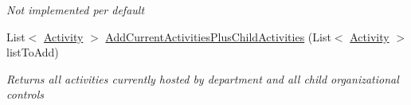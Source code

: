 \begin{DoxyCompactItemize}
\begin{DoxyCompactList}\small\item\em Not implemented per default \end{DoxyCompactList}\item 
List$<$ \hyperlink{class_simulation_core_1_1_h_c_c_m_elements_1_1_activity}{Activity} $>$ \hyperlink{class_general_health_care_elements_1_1_control_units_1_1_control_unit_organizational_unit_a42a076aea20d7fde0ae2bcc95f4de146}{Add\+Current\+Activities\+Plus\+Child\+Activities} (List$<$ \hyperlink{class_simulation_core_1_1_h_c_c_m_elements_1_1_activity}{Activity} $>$ list\+To\+Add)
\begin{DoxyCompactList}\small\item\em Returns all activities currently hosted by department and all child organizational controls \end{DoxyCompactList}\end{DoxyCompactItemize}
